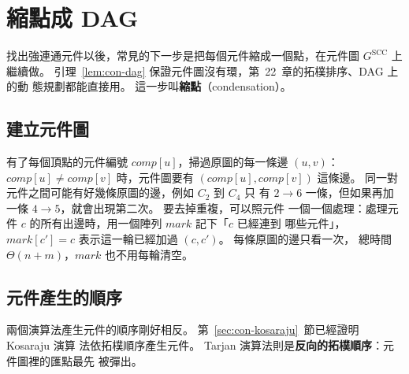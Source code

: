 \section{縮點成 DAG}
\label{sec:con-dag}

找出強連通元件以後，常見的下一步是把每個元件縮成一個點，在元件圖 $G^{\mathrm{SCC}}$
上繼續做。 引理~\ref{lem:con-dag} 保證元件圖沒有環，第~22~章的拓樸排序、DAG 上的動
態規劃都能直接用。 這一步叫\textbf{縮點}（condensation）。

\begin{center}
\label{fig:con-dag}
\end{center}

\subsection{建立元件圖}

有了每個頂點的元件編號 $\mathit{comp}[u]$，掃過原圖的每一條邊 $(u, v)$：
$\mathit{comp}[u] \ne \mathit{comp}[v]$ 時，元件圖要有 $(\mathit{comp}[u],
\mathit{comp}[v])$ 這條邊。 同一對元件之間可能有好幾條原圖的邊，例如 $C_2$ 到 $C_4$ 只
有 $2 \to 6$ 一條，但如果再加一條 $4 \to 5$，就會出現第二次。 要去掉重複，可以照元件
一個一個處理：處理元件 $c$ 的所有出邊時，用一個陣列 $\mathit{mark}$ 記下「$c$ 已經連到
哪些元件」，$\mathit{mark}[c'] = c$ 表示這一輪已經加過 $(c, c')$。 每條原圖的邊只看一次，
總時間 $\Theta(n + m)$，$\mathit{mark}$ 也不用每輪清空。

\subsection{元件產生的順序}

兩個演算法產生元件的順序剛好相反。 第~\ref{sec:con-kosaraju}~節已經證明 Kosaraju 演算
法依拓樸順序產生元件。 Tarjan 演算法則是\textbf{反向的拓樸順序}：元件圖裡的匯點最先
被彈出。

